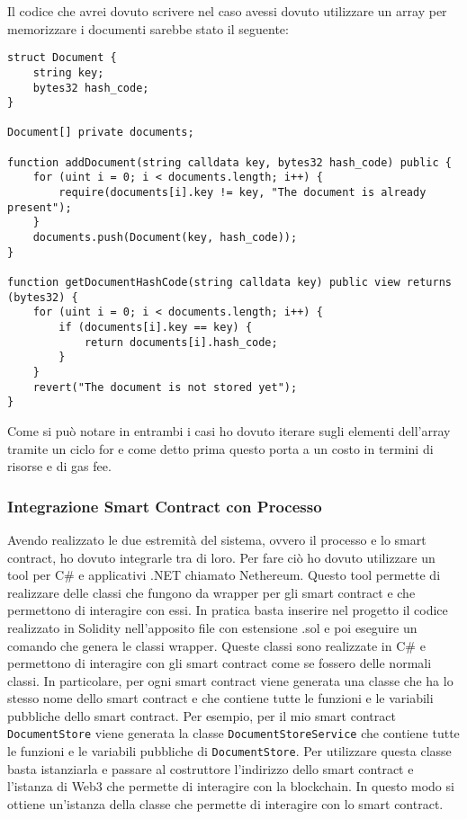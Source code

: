 Il codice che avrei dovuto scrivere nel caso avessi dovuto utilizzare un array
per memorizzare i documenti sarebbe stato il seguente:
\begin{lstlisting}[language=Solidity]
struct Document {
    string key;
    bytes32 hash_code;
}

Document[] private documents;

function addDocument(string calldata key, bytes32 hash_code) public {
    for (uint i = 0; i < documents.length; i++) {
        require(documents[i].key != key, "The document is already present");
    }
    documents.push(Document(key, hash_code));
}

function getDocumentHashCode(string calldata key) public view returns (bytes32) {
    for (uint i = 0; i < documents.length; i++) {
        if (documents[i].key == key) {
            return documents[i].hash_code;
        }
    }
    revert("The document is not stored yet");
}
\end{lstlisting}

Come si può notare in entrambi i casi ho dovuto iterare sugli elementi
dell'array tramite un ciclo for e come detto prima questo porta a un costo in
termini di risorse e di gas fee.

\subsubsection{Integrazione Smart Contract con Processo}
Avendo realizzato le due estremità del sistema, ovvero il processo e lo smart
contract, ho dovuto integrarle tra di loro. Per fare ciò ho dovuto utilizzare
un tool per C\# e applicativi .NET chiamato Nethereum. Questo tool permette di
realizzare delle classi che fungono da wrapper per gli smart contract e che
permettono di interagire con essi. In pratica basta inserire nel progetto
il codice realizzato in Solidity nell'apposito file con estensione .sol e poi
eseguire un comando che genera le classi wrapper. Queste classi sono
realizzate in C\# e permettono di interagire con gli smart contract come se
fossero delle normali classi. In particolare, per ogni smart contract viene
generata una classe che ha lo stesso nome dello smart contract e che contiene
tutte le funzioni e le variabili pubbliche dello smart contract. Per esempio,
per il mio smart contract \texttt{DocumentStore} viene generata la classe
\texttt{DocumentStoreService} che contiene tutte le funzioni e le variabili
pubbliche di \texttt{DocumentStore}. Per utilizzare questa classe basta
istanziarla e passare al costruttore l'indirizzo dello smart contract e
l'istanza di Web3 che permette di interagire con la blockchain. In questo modo
si ottiene un'istanza della classe che permette di interagire con lo smart
contract. 

